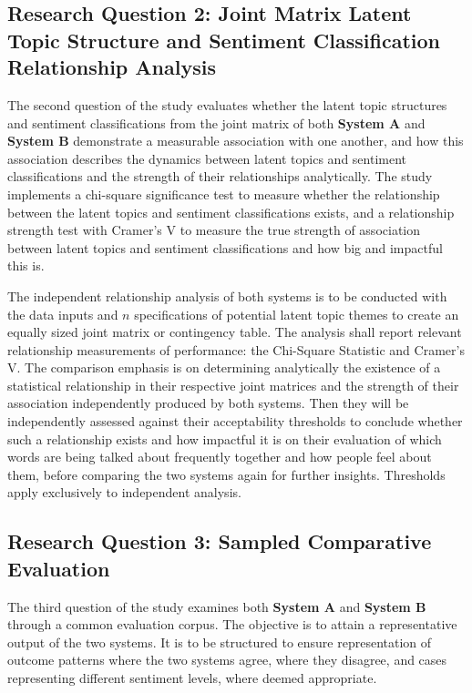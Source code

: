 \documentclass[12pt,a4paper]{report}
\newcommand{\sysA}{\textbf{System A}}
\newcommand{\sysB}{\textbf{System B}}
\begin{document}
\subsection{Research Question 2: Joint Matrix Latent Topic Structure and
Sentiment Classification Relationship Analysis}

The second question of the study evaluates whether the latent topic structures
and sentiment classifications from the joint matrix of both \sysA{} and \sysB{}
demonstrate a measurable association with one another, and how this association
describes the dynamics between latent topics and sentiment classifications and
the strength of their relationships analytically. The study implements a
chi-square significance test to measure whether the relationship between the
latent topics and sentiment classifications exists, and a relationship strength
test with Cramer's V to measure the true strength of association between latent
topics and sentiment classifications and how big and impactful this is.

The independent relationship analysis of both systems is to be conducted with
the data inputs and $n$ specifications of potential latent topic themes to
create an equally sized joint matrix or contingency table. The analysis shall
report relevant relationship measurements of performance: the Chi-Square
Statistic and Cramer's V. The comparison emphasis is on determining
analytically the existence of a statistical relationship in their respective
joint matrices and the strength of their association independently produced by
both systems. Then they will be independently assessed against their
acceptability thresholds to conclude whether such a relationship exists and how
impactful it is on their evaluation of which words are being talked about
frequently together and how people feel about them, before comparing the two
systems again for further insights. Thresholds apply exclusively to independent
analysis.

\subsection{Research Question 3: Sampled Comparative Evaluation}

The third question of the study examines both \sysA{} and \sysB{} through a
common evaluation corpus. The objective is to attain a representative output of
the two systems. It is to be structured to ensure representation of outcome
patterns where the two systems agree, where they disagree, and cases
representing different sentiment levels, where deemed appropriate.
\end{document}
